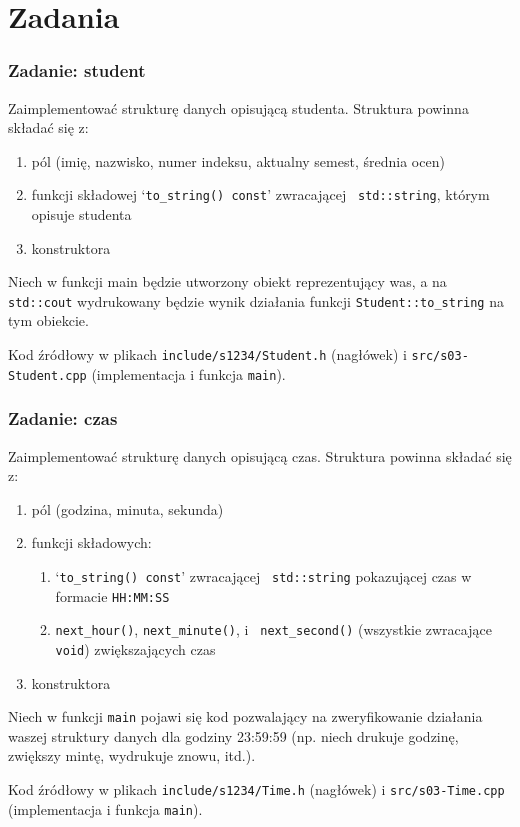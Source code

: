 \documentclass[aspectratio=169,10pt]{beamer}
\begin{document}
\section{Zadania}

\begin{frame}
    \frametitle{Zadanie: student}
    \label{lecture_exercise_0}

    Zaimplementować strukturę danych opisującą studenta. Struktura powinna
    składać się z:
    \begin{enumerate}
        \item pól (imię, nazwisko, numer indeksu, aktualny semest,
            średnia ocen)
        \item funkcji składowej `{\tt to\_string() const}' zwracającej {\tt
            std::string}, którym opisuje studenta
        \item konstruktora
    \end{enumerate}

    Niech w funkcji main będzie utworzony obiekt reprezentujący was, a na
    \texttt{std::cout} wydrukowany będzie wynik działania funkcji
    \texttt{Student::to\_string} na tym obiekcie.

    \vspace{1em}

    {\footnotesize
    Kod źródłowy w plikach {\tt include/s1234/Student.h} (nagłówek) i
    {\tt src/s03-Student.cpp} (implementacja i funkcja {\tt main}).}
\end{frame}

\begin{frame}
    \frametitle{Zadanie: czas}
    \label{lecture_exercise_1}

    Zaimplementować strukturę danych opisującą czas. Struktura powinna składać
    się z:
    \begin{enumerate}
        \item pól (godzina, minuta, sekunda)
        \item funkcji składowych:
            \begin{enumerate}
                \item `{\tt to\_string() const}' zwracającej {\tt
                    std::string} pokazującej czas w formacie {\tt HH:MM:SS}
                \item {\tt next\_hour()}, {\tt next\_minute()}, i {\tt
                    next\_second()} (wszystkie zwracające {\tt void})
                    zwiększających czas
            \end{enumerate}
        \item konstruktora
    \end{enumerate}

    Niech w funkcji \texttt{main} pojawi się kod pozwalający na zweryfikowanie
    działania waszej struktury danych dla godziny 23:59:59 (np. niech drukuje
    godzinę, zwiększy mintę, wydrukuje znowu, itd.).

    \vspace{1em}

    {\footnotesize
    Kod źródłowy w plikach {\tt include/s1234/Time.h} (nagłówek) i
    {\tt src/s03-Time.cpp} (implementacja i funkcja {\tt main}).}
\end{frame}
\end{document}
